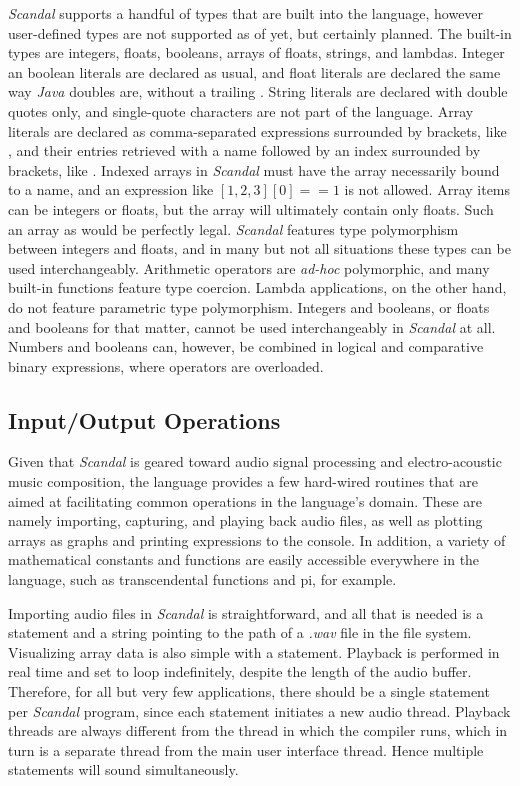 \emph{Scandal} supports a handful of types that are built into the language, however user-defined types are not supported as of yet, but certainly planned. The built-in types are integers, floats, booleans, arrays of floats, strings, and lambdas. Integer an boolean literals are declared as usual, and float literals are declared the same way \emph{Java} doubles are, without a trailing . String literals are declared with double quotes only, and single-quote characters are not part of the language. Array literals are declared as comma-separated expressions surrounded by brackets, like , and their entries retrieved with a name followed by an index surrounded by brackets, like . Indexed arrays in \emph{Scandal} must have the array necessarily bound to a name, and an expression like $[1, 2, 3][0] == 1$ is not allowed. Array items can be integers or floats, but the array will ultimately contain only floats. Such an array as  would be perfectly legal. \emph{Scandal} features type polymorphism between integers and floats, and in many but not all situations these types can be used interchangeably. Arithmetic operators are \emph{ad-hoc} polymorphic, and many built-in functions feature type coercion. Lambda applications, on the other hand, do not feature parametric type polymorphism. Integers and booleans, or floats and booleans for that matter, cannot be used interchangeably in \emph{Scandal} at all. Numbers and booleans can, however, be combined in logical and comparative binary expressions, where operators are overloaded.

\subsection{Input/Output Operations}

Given that \emph{Scandal} is geared toward audio signal processing and electro-acoustic music composition, the language provides a few hard-wired routines that are aimed at facilitating common operations in the language's domain. These are namely importing, capturing, and playing back audio files, as well as plotting arrays as graphs and printing expressions to the console. In addition, a variety of mathematical constants and functions are easily accessible everywhere in the language, such as transcendental functions and pi, for example.

Importing audio files in \emph{Scandal} is straightforward, and all that is needed is a  statement and a string pointing to the path of a \emph{.wav} file in the file system. Visualizing array data is also simple with a  statement. Playback is performed in real time and set to loop indefinitely, despite the length of the audio buffer. Therefore, for all but very few applications, there should be a single  statement per \emph{Scandal} program, since each  statement initiates a new audio thread. Playback threads are always different from the thread in which the compiler runs, which in turn is a separate thread from the main user interface thread. Hence multiple  statements will sound simultaneously.

